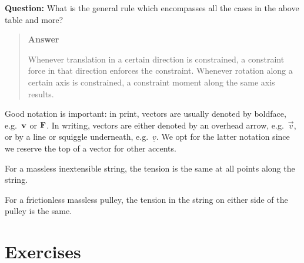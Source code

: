 \documentclass[
  letterpaper,
  DIV=11,
  numbers=noendperiod]{scrreprt}
\begin{document}
\begin{tcolorbox}[enhanced jigsaw, arc=.35mm, bottomrule=.15mm, bottomtitle=1mm, breakable, colback=white, colbacktitle=quarto-callout-tip-color!10!white, colframe=quarto-callout-tip-color-frame, coltitle=black, left=2mm, leftrule=.75mm, opacityback=0, opacitybacktitle=0.6, rightrule=.15mm, title=\textcolor{quarto-callout-tip-color}{\faLightbulb}\hspace{0.5em}{Think!}, titlerule=0mm, toprule=.15mm, toptitle=1mm]

\textbf{Question:} What is the general rule which encompasses all the
cases in the above table and more?

\begin{quote}
\textbf{Answer}

Whenever translation in a certain direction is constrained, a constraint
force in that direction enforces the constraint. Whenever rotation along
a certain axis is constrained, a constraint moment along the same axis
results.
\end{quote}

\end{tcolorbox}

\begin{tcolorbox}[enhanced jigsaw, arc=.35mm, bottomrule=.15mm, bottomtitle=1mm, breakable, colback=white, colbacktitle=quarto-callout-important-color!10!white, colframe=quarto-callout-important-color-frame, coltitle=black, left=2mm, leftrule=.75mm, opacityback=0, opacitybacktitle=0.6, rightrule=.15mm, title=\textcolor{quarto-callout-important-color}{\faExclamation}\hspace{0.5em}{Note! Notation}, titlerule=0mm, toprule=.15mm, toptitle=1mm]

Good notation is important: in print, vectors are usually denoted by
boldface, e.g.~\({\bf v}\) or \({\bf F}\). In writing, vectors are
either denoted by an overhead arrow, e.g.~\(\vec{v}\), or by a line or
squiggle underneath, e.g.~\(\underline{v}\). We opt for the latter
notation since we reserve the top of a vector for other accents.

\end{tcolorbox}

For a massless inextensible string, the tension is the same at all
points along the string.

For a frictionless massless pulley, the tension in the string on either
side of the pulley is the same.

\section{Exercises}\label{exercises-1}
\end{document}
